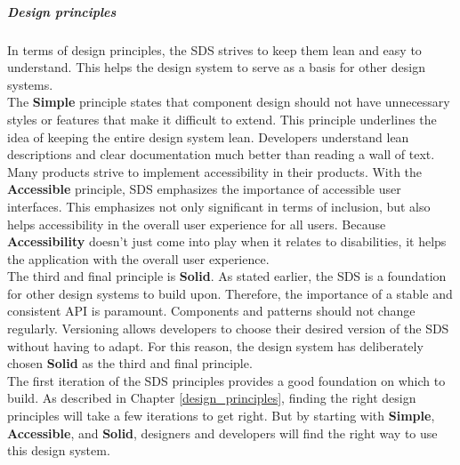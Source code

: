 \subparagraph{Design principles}
In terms of design principles, the \ac{SDS} strives to keep them lean and easy to understand. This helps the design system to serve as a basis for other design systems. \\
The \textbf{Simple} principle states that component design should not have unnecessary styles or features that make it difficult to extend. This principle underlines the idea of keeping the entire design system lean. Developers understand lean descriptions and clear documentation much better than reading a wall of text. \\
Many products strive to implement accessibility in their products. With the \textbf{Accessible} principle, \ac{SDS} emphasizes the importance of accessible user interfaces. This emphasizes not only significant in terms of inclusion, but also helps accessibility in the overall user experience for all users. Because \textbf{Accessibility} doesn't just come into play when it relates to disabilities, it helps the application with the overall user experience. \\
The third and final principle is \textbf{Solid}. As stated earlier, the \ac{SDS} is a foundation for other design systems to build upon. Therefore, the importance of a stable and consistent API is paramount. Components and patterns should not change regularly. Versioning allows developers to choose their desired version of the \ac{SDS} without having to adapt. For this reason, the design system has deliberately chosen \textbf{Solid} as the third and final principle. \\
The first iteration of the \acl{SDS} principles provides a good foundation on which to build. As described in Chapter \ref{design_principles}, finding the right design principles will take a few iterations to get right. But by starting with \textbf{Simple}, \textbf{Accessible}, and \textbf{Solid}, designers and developers will find the right way to use this design system.

